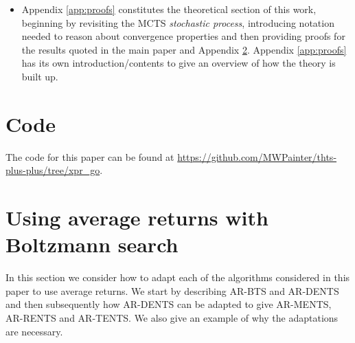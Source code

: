 \documentclass{article}
\theoremstyle{plain}
\begin{document}
\begin{appendices}
\begin{itemize}
\begin{itemize}
	\end{itemize}
	\item Appendix \ref{app:proofs} constitutes the theoretical section of this work, beginning by revisiting the MCTS \textit{stochastic process}, introducing notation needed to reason about convergence properties and then providing proofs for the results quoted in the main paper and Appendix \ref{app:average_returns}. Appendix \ref{app:proofs} has its own introduction/contents to give an overview of how the theory is built up.
\end{itemize}





















\section{Code} \label{app:code}
    The code for this paper can be found at \url{https://github.com/MWPainter/thts-plus-plus/tree/xpr_go}.









\newpage
\section{Using average returns with Boltzmann search} \label{app:average_returns}

    \FloatBarrier
    
    In this section we consider how to adapt each of the algorithms considered in this paper to use average returns. We start by describing AR-BTS and AR-DENTS and then subsequently how AR-DENTS can be adapted to give AR-MENTS, AR-RENTS and AR-TENTS. We also give an example of why the adaptations are necessary.


\end{appendices}
\end{document}
